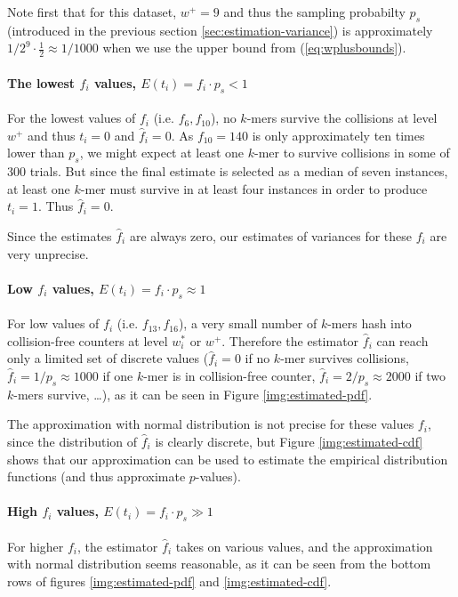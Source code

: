 Note first that for this dataset, $w^+ = 9$ and thus the sampling probabilty $p_s$
(introduced in the previous section \ref{sec:estimation-variance}) is approximately
$1/2^9 \cdot \frac{1}{2} \approx 1/1000 $ when we use the upper bound from (\ref{eq:wplusbounds}).

\paragraph{The lowest $f_i$ values, $E(t_i) = f_i \cdot p_s < 1$}
For the lowest values of $f_i$ (i.e. $f_6, f_{10}$), 
no $k$-mers survive the collisions at level $w^+$ and thus $t_i = 0$ and $\hat f_i = 0$. 
As $f_{10}=140$ is only approximately ten times lower than $p_s$, we might expect at least
one $k$-mer to survive collisions in some of 300 trials. But since the final estimate is selected
as a median of seven instances, at least one $k$-mer must survive in at least four instances
in order to produce $t_i = 1$. Thus $\hat f_i = 0$. 

Since the estimates $\hat f_i$ are always zero, our estimates of variances for these $f_i$ are 
very unprecise.

\paragraph{Low $f_i$ values, $E(t_i) = f_i \cdot p_s \approx 1$}
For low values of $f_i$ (i.e. $f_{13}, f_{16}$), a very small number of $k$-mers hash
into collision-free counters at level $w_i^*$ or $w^+$. Therefore the
estimator $\hat f_i$ can reach only a limited set of discrete 
values ($\hat f_i=0$ if no $k$-mer survives collisions, $\hat f_i = 1/p_s \approx 1000$
if one $k$-mer is in collision-free counter, $\hat f_i = 2/p_s \approx 2000$ 
if two $k$-mers survive, \dots), as it can be seen in Figure \ref{img:estimated-pdf}.

The approximation with normal distribution is not precise for these values $f_i$, since
the distribution of $\hat f_i$ is clearly discrete, but Figure \ref{img:estimated-cdf} shows
that our approximation can be used to estimate the empirical distribution
functions (and thus approximate $p$-values).

\paragraph{High $f_i$ values, $E(t_i) = f_i \cdot p_s \gg 1$}
For higher $f_i$, the estimator $\hat f_i$ takes on various values, and the approximation with
normal distribution seems reasonable, as it can be seen from the bottom rows of figures 
\ref{img:estimated-pdf} and \ref{img:estimated-cdf}.

